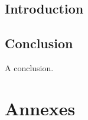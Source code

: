 \documentclass[11pt]{report}
\begin{document}
\newpage
{}
\tableofcontents

\chapter{Introduction}

\newpage

%
%
%
%

\chapter{Conclusion}

A conclusion.

\newpage
{}
\part*{Annexes}

\newpage
\listoffigures
\end{document}

